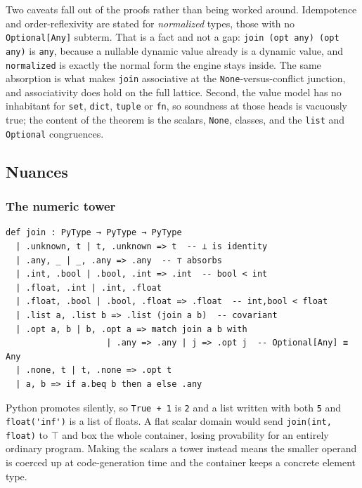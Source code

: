 \documentclass{article}
\newcommand{\code}{\lstinline}
\begin{document}
Two caveats fall out of the proofs rather than being worked around. Idempotence and order-reflexivity are stated for \emph{normalized} types, those with no \code{Optional[Any]} subterm. That is a fact and not a gap: \code{join (opt any) (opt any)} is \code{any}, because a nullable dynamic value already is a dynamic value, and \code{normalized} is exactly the normal form the engine stays inside. The same absorption is what makes \code{join} associative at the \code{None}-versus-conflict junction, and associativity does hold on the full lattice. Second, the value model has no inhabitant for \code{set}, \code{dict}, \code{tuple} or \code{fn}, so soundness at those heads is vacuously true; the content of the theorem is the scalars, \code{None}, classes, and the \code{list} and \code{Optional} congruences.

\subsection{Nuances}\label{app:ti-nuances}

\subsubsection{The numeric tower}\label{numeric-widening}

\begin{lstlisting}[language=lean,caption={Widening join over the numeric tower (excerpt).},label={lst:join}]
def join : PyType → PyType → PyType
  | .unknown, t | t, .unknown => t  -- ⊥ is identity
  | .any, _ | _, .any => .any  -- ⊤ absorbs
  | .int, .bool | .bool, .int => .int  -- bool < int
  | .float, .int | .int, .float
  | .float, .bool | .bool, .float => .float  -- int,bool < float
  | .list a, .list b => .list (join a b)  -- covariant
  | .opt a, b | b, .opt a => match join a b with
                    | .any => .any | j => .opt j  -- Optional[Any] ≡ Any
  | .none, t | t, .none => .opt t
  | a, b => if a.beq b then a else .any
\end{lstlisting}

Python promotes silently, so \code{True + 1} is \code{2} and a list written with both \code{5} and \code{float('inf')} is a list of floats. A flat scalar domain would send \code{join(int, float)} to $\top$ and box the whole container, losing provability for an entirely ordinary program. Making the scalars a tower instead means the smaller operand is coerced up at code-generation time and the container keeps a concrete element type.
\end{document}
